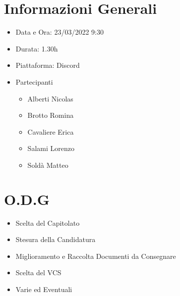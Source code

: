 \documentclass[a4paper, 12pt]{article}
\begin{document}
\makefrontpage

\section*{Informazioni Generali}
\begin{itemize}
    \item Data e Ora: 23/03/2022 9:30
    \item Durata: 1.30h
    \item Piattaforma: Discord
    \item Partecipanti
    \begin{itemize}
        \item Alberti Nicolas
        \item Brotto Romina
        \item Cavaliere Erica
        \item Salami Lorenzo
        \item Soldà Matteo
    \end{itemize}
\end{itemize}

\section*{O.D.G}
\begin{itemize}
    \item Scelta del Capitolato
    \item Stesura della Candidatura
    \item Miglioramento e Raccolta Documenti da Consegnare
    \item Scelta del VCS
    \item Varie ed Eventuali

\end{itemize}
\end{document}
